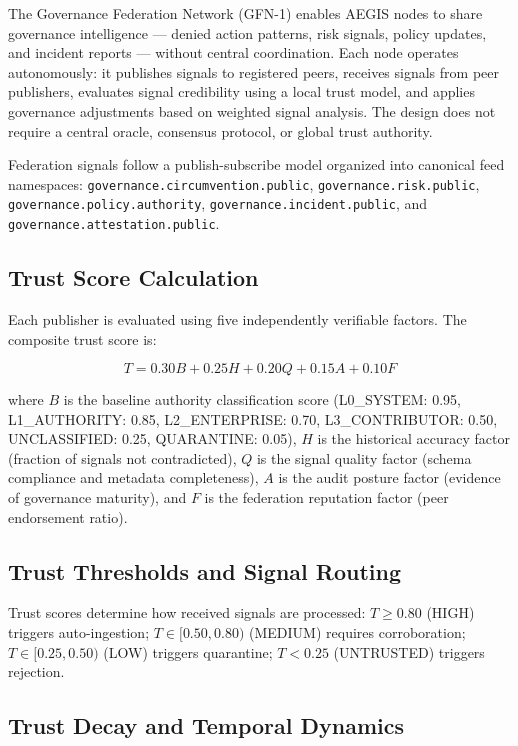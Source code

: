 \documentclass[journal]{IEEEtran}
\begin{document}
The Governance Federation Network (GFN-1) enables AEGIS nodes to share governance intelligence --- denied action patterns, risk signals, policy updates, and incident reports --- without central coordination. Each node operates autonomously: it publishes signals to registered peers, receives signals from peer publishers, evaluates signal credibility using a local trust model, and applies governance adjustments based on weighted signal analysis. The design does not require a central oracle, consensus protocol, or global trust authority.

Federation signals follow a publish-subscribe model organized into canonical feed namespaces: \texttt{governance.circumvention.public}, \texttt{governance.risk.public}, \texttt{governance.policy.authority}, \texttt{governance.incident.public}, and \texttt{governance.attestation.public}.

\subsection{Trust Score Calculation}

Each publisher is evaluated using five independently verifiable factors. The composite trust score is:

\begin{equation}
T = 0.30B + 0.25H + 0.20Q + 0.15A + 0.10F
\label{eq:trust}
\end{equation}

where $B$ is the baseline authority classification score (L0\_SYSTEM: 0.95, L1\_AUTHORITY: 0.85, L2\_ENTERPRISE: 0.70, L3\_CONTRIBUTOR: 0.50, UNCLASSIFIED: 0.25, QUARANTINE: 0.05), $H$ is the historical accuracy factor (fraction of signals not contradicted), $Q$ is the signal quality factor (schema compliance and metadata completeness), $A$ is the audit posture factor (evidence of governance maturity), and $F$ is the federation reputation factor (peer endorsement ratio).

\subsection{Trust Thresholds and Signal Routing}

Trust scores determine how received signals are processed: $T \geq 0.80$ (HIGH) triggers auto-ingestion; $T \in [0.50, 0.80)$ (MEDIUM) requires corroboration; $T \in [0.25, 0.50)$ (LOW) triggers quarantine; $T < 0.25$ (UNTRUSTED) triggers rejection.

\subsection{Trust Decay and Temporal Dynamics}
\end{document}
